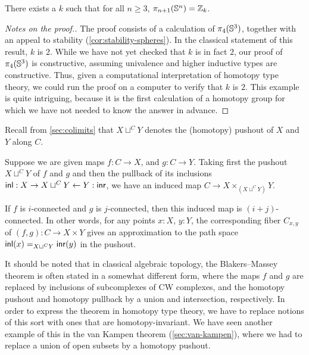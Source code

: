 \begin{thm}
There exists a $k$ such that for all $n \ge 3$, $\pi_{n+1}(\Sn ^n) =
\Z_k$.  
\end{thm}

\begin{proof}[Notes on the proof.]
The proof consists of a calculation of $\pi_4(\Sn ^3)$, together with an
appeal to stability (\cref{cor:stability-spheres}).  In the classical
statement of this result, $k$ is $2$.  While we have not yet checked that
$k$ is in fact $2$, our proof of $\pi_4(\Sn ^3)$ is constructive, assuming
univalence and higher inductive types are constructive.  Thus, given a
computational interpretation of homotopy type theory, we could run the
proof on a computer to verify that $k$ is $2$.  This example is quite
intriguing, because it is the first calculation of a homotopy group
for which we have not needed to know the answer in advance.
\end{proof}

Recall from \autoref{sec:colimits} that $X \sqcup^C Y$ denotes the
(homotopy) pushout of $X$ and $Y$ along $C$.
%

\begin{thm}\label{Blakers-Massey}
  Suppose we are given maps $f : C  \rightarrow X$, and $g : C \rightarrow Y$. Taking first the pushout $X \sqcup^C Y $ of $f$ and $g$ and then the pullback of its inclusions $\inl : X \rightarrow X \sqcup^C Y \leftarrow Y : \inr$, we have an induced map $C \to X \times_{(X \sqcup^C Y)} Y$.

  If $f$ is $i$-connected and $g$ is $j$-connected, then this induced map is $(i+j)$-connected. In other words, for any points $x:X$, $y:Y$, the corresponding fiber $C_{x,y}$ of $(f,g) : C \to X \times Y $ gives an approximation to the path space $\id[X \sqcup^C Y]{\inl(x)}{\inr(y)}$ in the pushout.
\end{thm}

It should be noted that in classical algebraic topology, the Blakers--Massey theorem is often stated in a somewhat different form, where the maps $f$ and $g$ are replaced by inclusions of subcomplexes of CW complexes, and the homotopy pushout and homotopy pullback by a union and intersection, respectively.
In order to express the theorem in homotopy type theory, we have to replace notions of this sort with ones that are homotopy-invariant.
We have seen another example of this in the van Kampen theorem (\autoref{sec:van-kampen}), where we had to replace a union of open subsets by a homotopy pushout.

